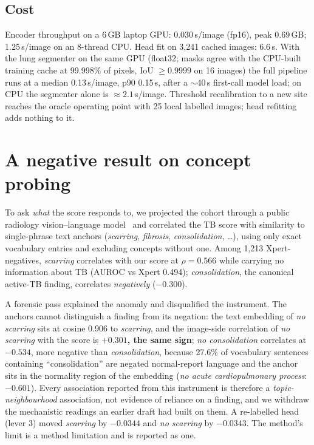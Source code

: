 \documentclass[11pt,a4paper]{article}
\begin{document}
\subsection{Cost}
Encoder throughput on a 6\,GB laptop GPU: 0.030\,s/image (fp16), peak 0.69\,GB; 1.25\,s/image on an 8-thread CPU. Head fit on 3,241 cached images: 6.6\,s. With the lung segmenter on the same GPU (float32; masks agree with the CPU-built training cache at 99.998\% of pixels, IoU $\geq 0.9999$ on 16 images) the full pipeline runs at a median 0.13\,s/image, p90 0.15\,s, after a $\sim$40\,s first-call model load; on CPU the segmenter alone is $\approx 2.1$\,s/image. Threshold recalibration to a new site reaches the oracle operating point with 25 local labelled images; head refitting adds nothing to it.

\section{A negative result on concept probing}\label{sec:concept}
To ask \emph{what} the score responds to, we projected the cohort through a public radiology vision--language model~\cite{han2026clear} and correlated the TB score with similarity to single-phrase text anchors (\emph{scarring}, \emph{fibrosis}, \emph{consolidation}, \ldots), using only exact vocabulary entries and excluding concepts without one. Among 1,213 Xpert-negatives, \emph{scarring} correlates with our score at $\rho=0.566$ while carrying no information about TB (AUROC vs Xpert 0.494); \emph{consolidation}, the canonical active-TB finding, correlates \emph{negatively} ($-0.300$).

A forensic pass explained the anomaly and disqualified the instrument. The anchors cannot distinguish a finding from its negation: the text embedding of \emph{no scarring} sits at cosine 0.906 to \emph{scarring}, and the image-side correlation of \emph{no scarring} with the score is \textbf{$+0.301$, the same sign}; \emph{no consolidation} correlates at \textbf{$-0.534$}, more negative than \emph{consolidation}, because 27.6\% of vocabulary sentences containing ``consolidation'' are negated normal-report language and the anchor sits in the normality region of the embedding (\emph{no acute cardiopulmonary process}: $-0.601$). Every association reported from this instrument is therefore a \emph{topic-neighbourhood} association, not evidence of reliance on a finding, and we withdraw the mechanistic readings an earlier draft had built on them. A re-labelled head (lever 3) moved \emph{scarring} by $-0.0344$ and \emph{no scarring} by $-0.0343$. The method's limit is a method limitation and is reported as one.
\end{document}
